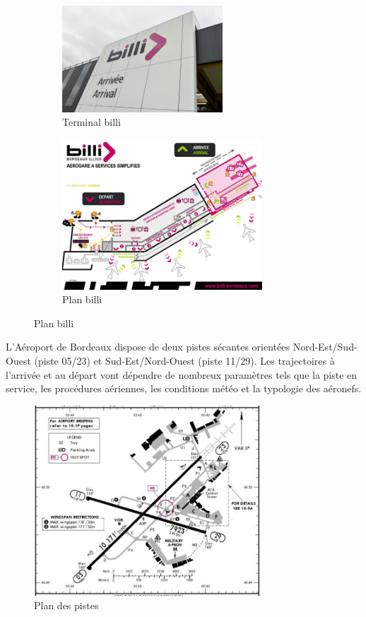 \begin{figure}[hbt!]
    \begin{subfigure}{.5\textwidth}
      \centering
      \includegraphics[width=6cm]{Images/billiext.jpg}  
      \caption{Terminal billi}
      \label{fig:billiext}
    \end{subfigure}
    \begin{subfigure}{.5\textwidth}
      \centering
      \includegraphics[width=7.5cm]{Images/billi.jpg}  
      \caption{Plan billi}
      \label{fig:planBilli}
    \end{subfigure}
    \label{fig:travaux}
\end{figure}

L’Aéroport de Bordeaux dispose de deux pistes sécantes orientées Nord-Est/Sud-Ouest (piste 05/23) et Sud-Est/Nord-Ouest (piste 11/29). Les trajectoires à l’arrivée et au départ vont dépendre de nombreux paramètres tels que la piste en service, les procédures aériennes, les conditions météo et la typologie des aéronefs.\newline

\begin{figure}[hbt!]
  \centering
  \includegraphics[width=8.5cm]{Images/pistes.jpg}
  \caption{Plan des pistes}
  \label{fig:pistes}
\end{figure}

